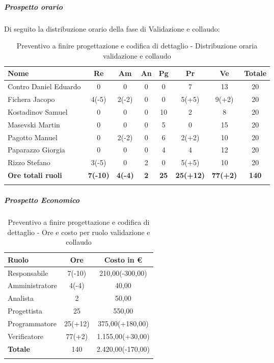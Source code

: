 \documentclass[../piano_di_progetto.tex]{subfiles}
\begin{document}
\subparagraph{Prospetto orario}
Di seguito la distribuzione orario della fase di Validazione e collaudo:
\begin{center}
	\begin{longtable}{|l|c|c|c|c|c|c|c|}
		\hline
		\rowcolor{lightgray}
		\textbf{Nome} & \textbf{Re} & \textbf{Am} & \textbf{An} & \textbf{Pg}  & \textbf{Pr}   & \textbf{Ve} & \textbf{Totale} \\

		\hline
			Contro Daniel Eduardo & 0 & 0 & 0 & 0 & 7 & 13 & 20\\
			Fichera Jacopo & 4(-5) & 2(-2) & 0 & 0 & 5(+5) & 9(+2) & 20 \\ 
			Kostadinov Samuel & 0 & 0 & 0 & 10 & 2 & 8 & 20 \\ 		
			Masevski Martin & 0 & 0 & 0 & 5 & 0 & 15 & 20 \\
			Pagotto Manuel & 0 & 2(-2) & 0 & 6 & 2(+2) & 10 & 20 \\			
			Paparazzo Giorgia & 0 & 0 & 0 & 4 & 4 & 12 & 20 \\
			Rizzo Stefano & 3(-5) & 0 & 2 & 0 & 5(+5) & 10 & 20 \\
			\hline
			\textbf{Ore totali ruoli} & \textbf{7(-10)} & \textbf{4(-4)} & \textbf{2} & \textbf{25} & \textbf{25(+12)} & \textbf{77(+2)} & \textbf{140} \\
			\hline
		\rowcolor{white}
		\caption{Preventivo a finire progettazione e codifica di dettaglio - Distribuzione oraria validazione e collaudo}
	\end{longtable}
\end{center}

\subparagraph{Prospetto Economico}

\begin{center}
	\begin{longtable}{|l|c|c|}
		\hline
		\rowcolor{lightgray}
		\textbf{Ruolo} & \textbf{Ore} & \textbf{Costo in €}\\

		\hline
		Responsabile & 7(-10) & 210,00(-300,00)\\
		Amministratore & 4(-4) & 40,00\\
		Analista & 2 & 50,00\\
		Progettista & 25 & 550,00\\
		Programmatore & 25(+12) & 375,00(+180,00)\\
		Verificatore & 77(+2) & 1.155,00(+30,00)\\
		\hline
		\textbf{Totale} & 140 & 2.420,00(-170,00)\\
		\hline
		\rowcolor{white}
		\caption{Preventivo a finire progettazione e codifica di dettaglio - Ore e costo per ruolo validazione e collaudo}
	\end{longtable}
\end{center}
\end{document}
